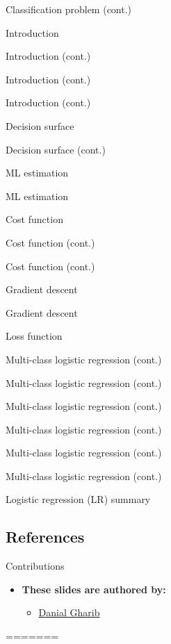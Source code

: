 \documentclass[serif, aspectratio=169]{beamer}
\begin{document}
\begin{frame}{Classification problem (cont.)}
\begin{itemize}
\begin{frame}{Introduction}
\begin{itemize}
\begin{frame}{Introduction (cont.)}
\begin{frame}{Introduction (cont.)}
\begin{frame}{Introduction (cont.)}
\begin{frame}{Decision surface}
\begin{itemize}
\begin{frame}{Decision surface (cont.)}
\begin{frame}{ML estimation}
\begin{frame}{ML estimation}
\begin{itemize}
\begin{frame}{Cost function}
\begin{frame}{Cost function (cont.)}
\begin{itemize}
\begin{itemize}
\begin{frame}{Cost function (cont.)}
\begin{frame}{Gradient descent}
\begin{frame}{Gradient descent}
\begin{frame}{Loss function}
\begin{frame}{Multi-class logistic regression (cont.)}
\begin{frame}{Multi-class logistic regression (cont.)}
\begin{frame}{Multi-class logistic regression (cont.)}
\begin{frame}{Multi-class logistic regression (cont.)}
\begin{frame}{Multi-class logistic regression (cont.)}
\begin{frame}{Multi-class logistic regression (cont.)}
\begin{frame}{Logistic regression (LR) summary}
\begin{itemize}
\section{References}

\begin{frame}{Contributions}
\begin{itemize}
\item \textbf{These slides are authored by:}
\begin{itemize}
    \setlength{\itemsep}{10pt} %
    \item \href{https://github.com/Danial-Gharib}{Danial Gharib}
\end{itemize}
\end{itemize}

\end{frame}

\begin{frame}[allowframebreaks]
    
    
    \nocite{*}
\end{frame}

=======


\end{itemize}
\end{frame}
\end{frame}
\end{frame}
\end{frame}
\end{frame}
\end{frame}
\end{frame}
\end{frame}
\end{frame}
\end{frame}
\end{frame}
\end{itemize}
\end{itemize}
\end{frame}
\end{frame}
\end{itemize}
\end{frame}
\end{frame}
\end{frame}
\end{itemize}
\end{frame}
\end{frame}
\end{frame}
\end{frame}
\end{itemize}
\end{frame}
\end{itemize}
\end{frame}
\end{document}
